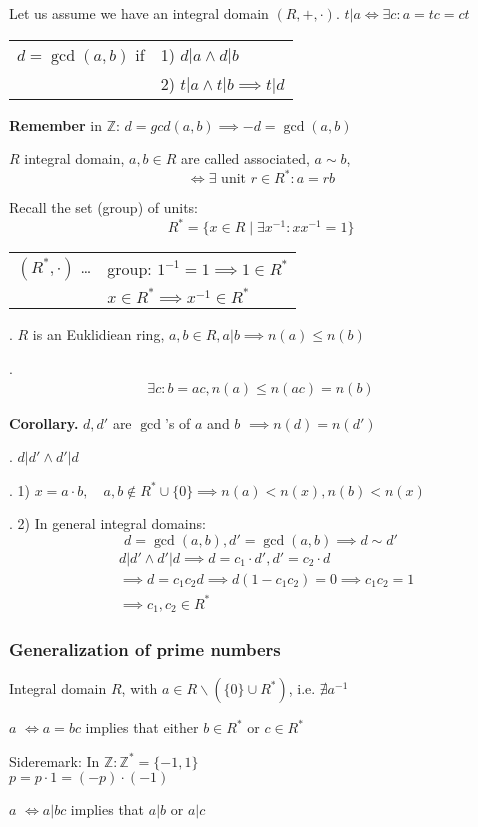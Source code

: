 Let us assume we have an integral domain $(R,+, \cdot)$. 
$t|a \Leftrightarrow \exists c: a=tc =ct$
\begin{tabular}{ll}
$d=\gcd(a,b)$ if & 1) $d|a \land d|b$ \\
  & 2) $t|a \land t|b \implies t|d$
\end{tabular}

\textbf{Remember}
in $\mathbb{Z}$: $d = gcd(a,b) \implies -d = \gcd(a,b)$

\begin{definition}
$R$ integral domain, 
$a,b \in R$ are called associated, $a \sim b$,
\[
  \Leftrightarrow \exists \text{ unit } r \in R^{*}: a = rb
\]
\end{definition}

Recall the set (group) of units:
\[
  R^{*} = \{ x \in R \mid \exists x^{-1} : xx^{-1} = 1\}
\]
\begin{tabular}{ll}
  $(R^{*}, \cdot)$ \ldots 
    & group: $1^{-1} = 1 \implies 1 \in R^{*}$ \\
    & $x\in R^{*} \implies x^{-1} \in R^{*}$
\end{tabular}

\Theorem.
$R$ is an Euklidiean ring, $a,b\in R, a|b \implies n(a) \leq n(b)$

\Proof.
\begin{align*}
  \exists c : b = ac, n(a) \leq n(ac) = n(b)
\end{align*}

\textbf{Corollary.}
$d, d'$ are $\gcd$'s of $a$ and $b$ $\implies n(d) = n(d')$

\Proof.
$d|d' \land d' | d$


\Remark.
1) $x = a\cdot b, \quad a,b\not\in R^{*} \cup \{0\} \implies n(a) < n(x), n(b) < n(x)$

\Remark.
2) In general integral domains: 
\[
  d= \gcd(a,b), d' = \gcd(a,b) \implies d \sim d'
\]
\begin{align*}
  &d|d' \land d'|d \implies d = c_1\cdot d', d' = c_2 \cdot d \\
  &\implies d = c_1c_2 d \implies d (1-c_1c_2) = 0 \implies c_1 c_2 = 1\\
  &\implies c_1,c_2 \in R^{*}
\end{align*}

\subsubsection{Generalization of prime numbers}
\begin{definition}
  Integral domain $R$, with $a\in R \backslash (\{0\}\cup R^{*})$, i.e. $\nexists a^{-1}$

$a$  $\Leftrightarrow a = bc$ implies that either $b\in R^{*}$ or $c\in R^{*}$

Sideremark: 
In $\mathbb{Z}: \mathbb{Z}^{*} = \{-1, 1\}$ \\
$p = p \cdot 1 = (-p) \cdot (-1)$

$a$  $\Leftrightarrow a | bc$ implies that $a|b$ or $a|c$
\end{definition}

